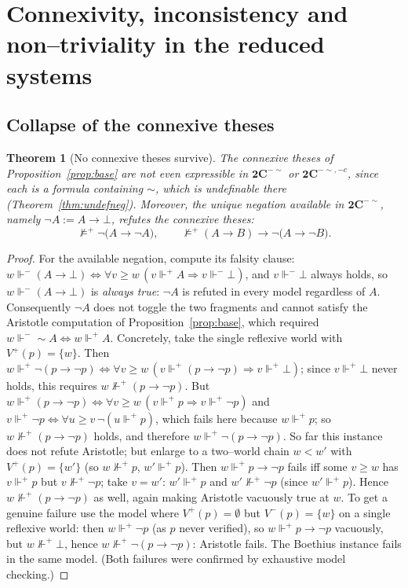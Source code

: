 \documentclass{amsart}
\theoremstyle{plain}
\newtheorem{theorem}{Theorem}
\theoremstyle{definition}
\newcommand{\To}{\rightarrow}
\newcommand{\Ci}{\mathbf{2C}^{-{\sim}}}        %
\newcommand{\Cii}{\mathbf{2C}^{-{\sim},-c}}    %
\newcommand{\fp}{\Vdash^{+}}
\newcommand{\fm}{\Vdash^{-}}
\begin{document}
\section{Connexivity, inconsistency and non--triviality in the reduced systems}
\label{sec:conn}

\subsection{Collapse of the connexive theses}

\begin{theorem}[No connexive theses survive]\label{thm:nocon}
The connexive theses of Proposition~\ref{prop:base} are not even expressible in
$\Ci$ or $\Cii$, since each is a formula containing ${\sim}$, which is
undefinable there (Theorem~\ref{thm:undefneg}). Moreover, the unique negation
available in $\Ci$, namely $\neg A:=A\To\bot$, refutes the connexive theses:
\[
\not\models^{+}\neg\bigl(A\To\neg A\bigr),\qquad
\not\models^{+}(A\To B)\To\neg\bigl(A\To\neg B\bigr).
\]
\end{theorem}
\begin{proof}
For the available negation, compute its falsity clause:
$w\fm(A\To\bot)\iff\forall v\ge w\,(v\fp A\Rightarrow v\fm\bot)$, and
$v\fm\bot$ always holds, so $w\fm(A\To\bot)$ is \emph{always true}: $\neg A$ is
refuted in every model regardless of $A$. Consequently $\neg A$ does not toggle
the two fragments and cannot satisfy the Aristotle computation of
Proposition~\ref{prop:base}, which required $w\fm{\sim}A\iff w\fp A$. Concretely,
take the single reflexive world with $V^{+}(p)=\{w\}$. Then
$w\fp\neg(p\To\neg p)\iff\forall v\ge w\,(v\fp(p\To\neg p)\Rightarrow v\fp\bot)$;
since $v\fp\bot$ never holds, this requires $w\not\fp(p\To\neg p)$. But
$w\fp(p\To\neg p)\iff\forall v\ge w\,(v\fp p\Rightarrow v\fp\neg p)$ and
$v\fp\neg p\iff\forall u\ge v\,\neg(u\fp p)$, which fails here because
$w\fp p$; so $w\not\fp(p\To\neg p)$ holds, and therefore $w\fp\neg(p\To\neg
p)$. So far this instance does not refute Aristotle; but enlarge to a two--world
chain $w<w'$ with $V^+(p)=\{w'\}$ (so $w\not\fp p$, $w'\fp p$). Then
$w\fp p\To\neg p$ fails iff some $v\ge w$ has $v\fp p$ but $v\not\fp\neg p$;
take $v=w'$: $w'\fp p$ and $w'\not\fp\neg p$ (since $w'\fp p$). Hence
$w\not\fp(p\To\neg p)$ as well, again making Aristotle vacuously true at $w$.
To get a genuine failure use the model where $V^+(p)=\emptyset$ but $V^-(p)=\{w\}$
on a single reflexive world: then $w\fp\neg p$ (as $p$ never verified), so
$w\fp p\To\neg p$ vacuously, but $w\not\fp\bot$, hence
$w\not\fp\neg(p\To\neg p)$: Aristotle fails. The Boethius instance fails in the
same model. (Both failures were confirmed by exhaustive model checking.)
\end{proof}
\end{document}
